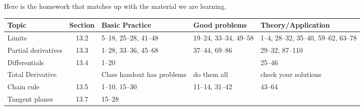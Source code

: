 \newpage



Here is the homework that matches up with the material we are
learning.

\begin{center}
  \begin{tabular}{lcp{1.25in}p{1.25in}p{1.25in}}\toprule
    Topic & Section & Basic Practice & Good problems & Theory/Application \\\midrule
    Limits & 13.2 & 5--18, 25--28, 41--48 & 19--24, 33--34, 49--58 & 1--4, 28--32, 35--40, 59--62, 63--78\\
    Partial derivatives & 13.3 & 1--28, 33--36, 45--68 & 37--44, 69--86 & 29--32, 87--110\\
    Differentials & 13.4 & 1--20 & & 25--46 \\
    Total Derivative &&Class handout has problems & do them all& check your solutions  \\
    Chain rule & 13.5 & 1--10, 15--30 & 11--14, 31--42 & 43--64\\
    Tangent planes & 13.7 & 15--28 & &    \\\bottomrule
  \end{tabular}
\end{center}



